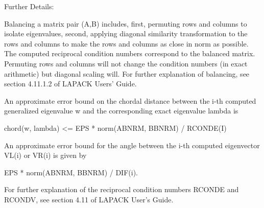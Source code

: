 \begin{DoxyParagraph}{Further Details\+: }
\begin{DoxyVerb}  Balancing a matrix pair (A,B) includes, first, permuting rows and
  columns to isolate eigenvalues, second, applying diagonal similarity
  transformation to the rows and columns to make the rows and columns
  as close in norm as possible. The computed reciprocal condition
  numbers correspond to the balanced matrix. Permuting rows and columns
  will not change the condition numbers (in exact arithmetic) but
  diagonal scaling will.  For further explanation of balancing, see
  section 4.11.1.2 of LAPACK Users' Guide.

  An approximate error bound on the chordal distance between the i-th
  computed generalized eigenvalue w and the corresponding exact
  eigenvalue lambda is

       chord(w, lambda) <= EPS * norm(ABNRM, BBNRM) / RCONDE(I)

  An approximate error bound for the angle between the i-th computed
  eigenvector VL(i) or VR(i) is given by

       EPS * norm(ABNRM, BBNRM) / DIF(i).

  For further explanation of the reciprocal condition numbers RCONDE
  and RCONDV, see section 4.11 of LAPACK User's Guide.\end{DoxyVerb}
 
\end{DoxyParagraph}
